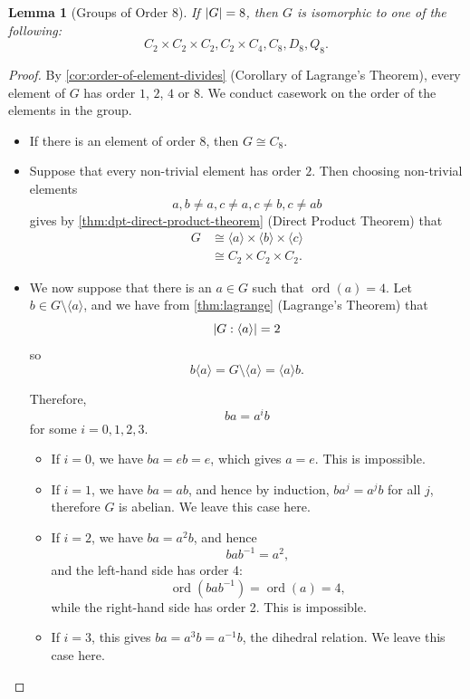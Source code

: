 \documentclass{article}
\newtheorem{lemma}[theorem]{Lemma}
\theoremstyle{definition}
\theoremstyle{remark}
\DeclarePairedDelimiter{\abs}{\lvert}{\rvert}
\newcommand{\pqty}[1]{\left(#1\right)}
\newcommand{\angBrac}[1]{\langle #1\rangle}
\newcommand{\inverse}{^{-1}}
\newcommand{\isomorphic}{\cong}
\newcommand{\ord}{\operatorname{ord}}
\begin{document}
\begin{lemma}[Groups of Order 8]
    \label{lem:groups-of-order-8}%
    If \(\abs{G} = 8\), then \(G\) is isomorphic to one of the following:
    \[
        C_2 \times C_2 \times C_2, C_2 \times C_4, C_8, D_8, Q_8.
    \]
\end{lemma}

\begin{proof}
    By \autoref{cor:order-of-element-divides} (Corollary of Lagrange's Theorem), every element of \(G\) has order \(1\), \(2\), \(4\) or \(8\). We conduct casework on the order of the elements in the group.

    \begin{itemize}
        \item If there is an element of order \(8\), then \(G \isomorphic C_8\).
        
        \item Suppose that every non-trivial element has order \(2\). Then choosing non-trivial elements
        \[
            a, b \neq a, c \neq a, c \neq b, c \neq ab
        \]
        gives by \autoref{thm:dpt-direct-product-theorem} (Direct Product Theorem) that
        \begin{align*}
            G &\isomorphic \angBrac{a} \times \angBrac{b} \times \angBrac{c} \\
            &\isomorphic C_2 \times C_2 \times C_2.
        \end{align*}

        \item We now suppose that there is an \(a \in G\) such that \(\ord\pqty{a} = 4\). Let \(b \in G \setminus \angBrac{a}\), and we have from \autoref{thm:lagrange} (Lagrange's Theorem) that
        \[
            \abs{G : \angBrac{a}} = 2
        \]
        so
        \[
            b\angBrac{a} = G \setminus \angBrac{a} = \angBrac{a} b.
        \]

        Therefore,
        \[
            b a = a^i b
        \]
        for some \(i = 0, 1, 2, 3\).

        \begin{itemize}
            \item If \(i = 0\), we have \(ba = eb = e\), which gives \(a = e\). This is impossible.
            \item If \(i = 1\), we have \(ba = ab\), and hence by induction, \(b a^j = a^j b\) for all \(j\), therefore \(G\) is abelian. We leave this case here.
            \item If \(i = 2\), we have \(ba = a^2 b\), and hence
            \[
                b a b\inverse = a^2,
            \]
            and the left-hand side has order 4:
            \[
                \ord\pqty{b a b \inverse} = \ord\pqty{a} = 4,
            \]
            while the right-hand side has order 2. This is impossible.
            \item If \(i = 3\), this gives \(ba = a^3 b = a\inverse b\), the dihedral relation. We leave this case here.
        \end{itemize}


\end{itemize}
\end{proof}
\end{document}
